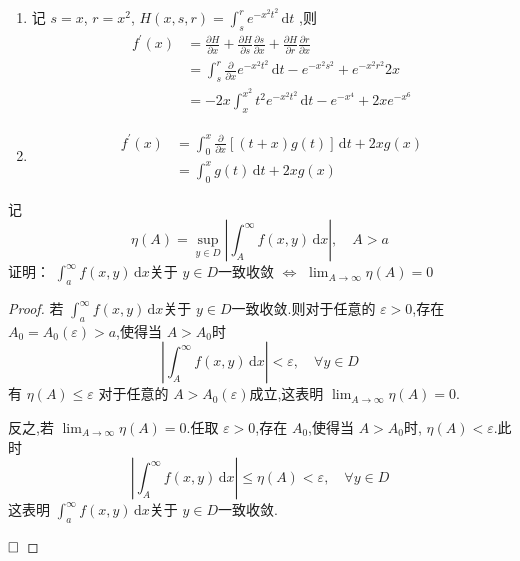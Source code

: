 \documentclass[lang=cn,12pt,color=green,fontset=none,thmcnt=section]{elegantbook}
\begin{document}
\begin{solution}
    \begin{enumerate}
        \item  记 $ s = x $, $ r= x^{2} $, $ H\left( x,s,r \right) = \int_{s}^{r} e^{-x^{2}t^{2}}\,\mathrm{d} t  $   ,则 $$
        \begin{aligned}
        f^{\prime} \left( x \right)&  = \frac{\partial H}{\partial x} +  \frac{\partial H}{\partial s} \frac{\partial s}{\partial x}+  \frac{\partial H}{\partial r} \frac{\partial r}{\partial x}  \\ 
         & = \int_{s}^{r} \frac{\partial }{\partial x} e^{-x^{2}t^{2}} \,\mathrm{d} t -e^{-x^{2}s^{2}}+ e^{-x^{2}r^{2}}2x\\ 
          & = -2x\int_{x}^{x^{2}}t^{2} e^{-x^{2}t^{2}}\,\mathrm{d} t- e^{-x^{4}}+ 2x e^{-x^{6}}
        \end{aligned}
        $$
        \item  $$
        \begin{aligned}
        f^{\prime} \left( x \right) & = \int_{0}^{x} \frac{\partial }{\partial x}  [\left( t+ x \right) g\left( t \right)  ]\,\mathrm{d} t + 2xg\left( x \right) \\ 
         & =  \int_{0}^{x}g\left( t \right)\,\mathrm{d} t+  2xg\left( x \right)  
        \end{aligned}
        $$
    \end{enumerate}
    
\end{solution}

\begin{exercise}
    记 $$
     \eta \left( A \right)  = \sup _{y \in D} \left| \int_{A}^{\infty} f\left( x,y \right) \,\mathrm{d} x  \right| ,\quad  A >a
    $$证明： $ \int_{a}^{\infty} f\left( x,y \right)\,\mathrm{d} x  $关于 $ y \in D $一致收敛 $ \iff $ $ \lim_{A \to \infty}\eta \left( A \right)=0  $    
\end{exercise}
\begin{proof}
    若 $ \int_{a}^{\infty} f\left( x,y \right)\,\mathrm{d} x  $关于 $ y \in D $一致收敛.则对于任意的 $ \varepsilon >0 $,存在 $ A_{0} = A_{0}\left( \varepsilon  \right)>a  $,使得当 $ A >A_0 $时 $$
    \left| \int_{A}^{\infty} f\left( x,y \right) \,\mathrm{d} x  \right|<\varepsilon ,\quad  \forall  y \in D 
    $$  有 $ \eta \left( A \right)   \le \varepsilon    $    对于任意的 $ A >A_0\left( \varepsilon  \right)  $成立,这表明 $ \lim_{A \to \infty}\eta \left( A \right) =0 $.
    
    反之,若 $ \lim_{A \to \infty}\eta \left( A \right)=0  $.任取 $ \varepsilon >0 $,存在 $ A_0 $,使得当 $ A> A_0 $时, $ \eta \left( A \right) <\varepsilon   $.此时 $$
    \left| \int_{A}^{\infty}f\left( x,y \right)\,\mathrm{d} x  \right| \le \eta \left( A \right)<\varepsilon  ,\quad  \forall  y\in D  
    $$      这表明 $ \int_{a}^{\infty}f\left( x,y \right)\,\mathrm{d} x  $关于 $ y \in D $一致收敛.  

    $\hfill\square$
\end{proof}
\end{document}
